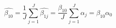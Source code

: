 \begin{equation}
\label{avgest}
\hat{\beta_{10}} = \frac{1}{J}\sum\limits_{j=1}^J{\hat{\beta_{1j}}} = \frac{\beta_{10}}{J}\sum\limits_{j=1}^J{\alpha_j} = \beta_{10}\alpha_0
\end{equation}